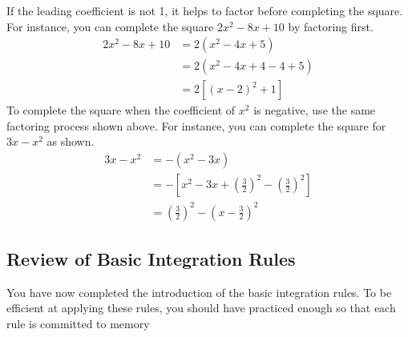 \documentclass[12pt, letterpaper]{article}
\begin{document}
If the leading  coefficient is not 1, it helps to factor before completing the square. For instance, you can complete the square $2x^2-8x+10$ by factoring first.
\begin{align*}
    2x^2-8x+10 &= 2(x^2-4x+5) \\
    &= 2(x^2-4x+4-4+5) \\
    &= 2[(x-2)^2+1]
\end{align*}
To complete the square when the coefficient of $x^2$ is negative, use the same factoring process shown above. For instance, you can complete the square for $3x-x^2$ as shown.
\begin{align*}
    3x-x^2 &= -(x^2-3x) \\
    &= - \left[ x^2 -3x + \left( \frac{3}{2} \right)^2 - \left( \frac{3}{2} \right)^2   \right] \\
    &= \left( \frac{3}{2} \right)^2 - \left( x-\frac{3}{2} \right)^2
\end{align*}


\subsection{Review of Basic Integration Rules}

You have now completed the introduction of the basic integration rules. To be efficient at applying these rules, you should have practiced enough so that each rule is committed to memory
\end{document}
